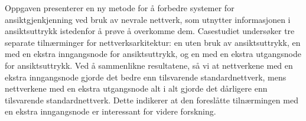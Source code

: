 \noindent Oppgaven presenterer en ny metode for å forbedre systemer for ansiktgjenkjenning ved bruk av nevrale nettverk, som utnytter informasjonen i ansiktsuttrykk istedenfor å prøve å overkomme dem. Casestudiet undersøker tre separate tilnærminger for nettverksarkitektur: en uten bruk av ansiktsuttrykk, en med en ekstra inngangsnode for ansiktsuttrykk, og en med en ekstra utgangsnode for ansiktsuttrykk. Ved å sammenlikne resultatene, så vi at nettverkene med en ekstra inngangsnode gjorde det bedre enn tilsvarende standardnettverk, mens nettverkene med en ekstra utgangsnode alt i alt gjorde det dårligere enn tilsvarende standardnettverk. Dette indikerer at den foreslåtte tilnærmingen med en ekstra inngangsnode er interessant for videre forskning.

\clearpage